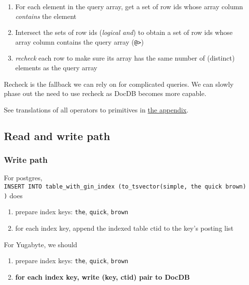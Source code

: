 \documentclass[
]{article}
\providecommand{\tightlist}{%
  \setlength{\itemsep}{0pt}\setlength{\parskip}{0pt}}
\begin{document}
\begin{enumerate}
\def\labelenumi{\arabic{enumi}.}
\tightlist
\item
  For each element in the query array, get a set of row ids whose array
  column \emph{contains} the element
\item
  Intersect the sets of row ids (\emph{logical and}) to obtain a set of
  row ids whose array column contains the query array
  (\texttt{@\textgreater{}})
\item
  \emph{recheck} each row to make sure its array has the same number of
  (distinct) elements as the query array
\end{enumerate}

Recheck is the fallback we can rely on for complicated queries. We can
slowly phase out the need to use recheck as DocDB becomes more capable.

See translations of all operators to primitives in
\protect\hyperlink{operators-to-primitives}{the appendix}.

\hypertarget{read-and-write-path}{%
\subsection{Read and write path}\label{read-and-write-path}}

\hypertarget{write-path}{%
\subsubsection{Write path}\label{write-path}}

For postgres,
\texttt{INSERT\ INTO\ table\_with\_gin\_index\ (to\_tsvector(\textquotesingle{}simple\textquotesingle{},\ \textquotesingle{}the\ quick\ brown\textquotesingle{}))}
does

\begin{enumerate}
\def\labelenumi{\arabic{enumi}.}
\tightlist
\item
  prepare index keys: \texttt{the}, \texttt{quick}, \texttt{brown}
\item
  for each index key, append the indexed table ctid to the key's posting
  list
\end{enumerate}

For Yugabyte, we should

\begin{enumerate}
\def\labelenumi{\arabic{enumi}.}
\tightlist
\item
  prepare index keys: \texttt{the}, \texttt{quick}, \texttt{brown}
\item
  \textbf{for each index key, write (key, ctid) pair to DocDB}
\end{enumerate}
\end{document}
